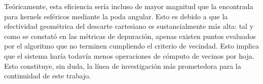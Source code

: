 Teóricamente, esta eficiencia sería incluso de mayor magnitud que la encontrada para kernels esféricos mediante la poda angular. Esto es debido a que la efectividad geométrica del descarte cartesiano es sustancialmente más alta: tal y como se constató en las métricas de depuración, apenas existen puntos evaluados por el algoritmo que no terminen cumpliendo el criterio de vecindad. Esto implica que el sistema haría todavía menos operaciones de cómputo de vecinos por hoja. Esto constituye, sin duda, la línea de investigación más prometedora para la continuidad de este trabajo.

